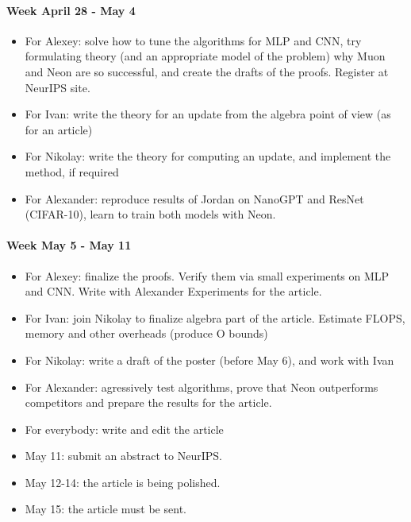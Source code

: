 \documentclass[]{scrartcl}
\begin{document}
\paragraph{Week April 28 - May 4}
\begin{itemize}
    \item For Alexey: solve how to tune the algorithms for MLP and CNN, try formulating theory (and an appropriate model of the problem) why Muon and Neon are so successful, and create the drafts of the proofs. Register at NeurIPS site.
    
    \item For Ivan: write the theory for an update from the algebra point of view (as for an article)
    
    \item For Nikolay: write the theory for computing an update, and implement the method, if required
    
    \item For Alexander: reproduce results of Jordan on NanoGPT and ResNet (CIFAR-10), learn to train both models with Neon.
\end{itemize}

\paragraph{Week May 5 - May 11}
\begin{itemize}
    \item For Alexey: finalize the proofs. Verify them via small experiments on MLP and CNN. Write with Alexander Experiments for the article.
    
    \item For Ivan: join Nikolay to finalize algebra part of the article. Estimate FLOPS, memory and other overheads (produce O bounds)
    
    \item For Nikolay: write a draft of the poster (before May 6), and work with Ivan
    
    \item For Alexander: agressively test algorithms, prove that Neon outperforms competitors and prepare the results for the article.
    
    \item For everybody: write and edit the article
    
    \item May 11: submit an abstract to NeurIPS.
    
    \item May 12-14: the article is being polished.
    
    \item May 15: the article must be sent.
\end{itemize}
\end{document}
